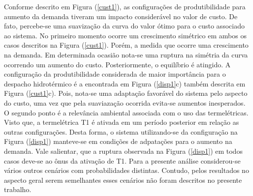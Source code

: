 \documentclass[12pt,fleqn]{article}
\begin{document}
Conforme descrito em Figura (\ref{cust1}), as configura\c c\~oes de produtibilidade para aumento da demanda tiveram um impacto consider\'avel no valor de custo. De fato, percebe-se uma suaviza\c c\~ao da curva do valor \'otimo para o custo associado ao sistema. No primeiro momento ocorre um crescimento sim\'etrico em ambos os casos descritos na Figura (\ref{cust1}). Por\'em, a medida que ocorre uma crescimento na demanda. Em determinada ocasi\~ao nota-se uma ruptura na sim\'etria da curva ocorrendo um aumento do custo. Posteriormente, o equil\'ibrio \'e atingido. A configura\c c\~ao da produtibilidade considerada de maior import\^ancia para o despacho hidrot\'ermico \'e a encontrada em Figura (\ref{disp1}c) tamb\'em descrita em Figura (\ref{cust1}c). Pois, nota-se uma adapta\c c\~ao favor\'avel do sistema pelo aspecto do custo, uma vez que pela suaviaza\c c\~ao ocorrida evita-se aumentos inesperados. O segundo ponto  \'e a relev\^ancia ambiental associada com o uso das termel\'etricas. Visto que, a termel\'etrica T1 \'e ativada em um per\'iodo posterior em rela\c c\~ao as outras configura\c c\~oes. Desta forma, o sistema utilizando-se da configura\c c\~ao na Figura (\ref{disp1}) manteve-se em condi\c c\~oes de adpata\c c\~oes para o aumento na demanda. Vale salientar, que a ruptura observada na Figura (\ref{disp1}) em todos casos deve-se ao \^onus da ativa\c c\~ao de T1. Para a presente an\'alise considerou-se v\'arios outros cen\'arios com probabilidades distintas. Contudo, pelos resultados no aspecto geral serem semelhantes esses cen\'arios n\~ao foram descritos no presente trabalho.
\end{document}

